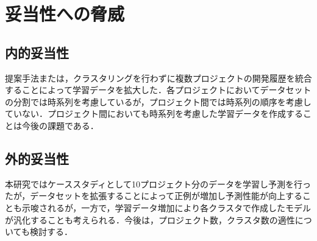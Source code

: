 \documentclass[T,J]{fose} %
\begin{document}



\section{妥当性への脅威}\label{sec:heuristic}
\subsection{内的妥当性}

提案手法または，クラスタリングを行わずに複数プロジェクトの開発履歴を統合することによって学習データを拡大した．各プロジェクトにおいてデータセットの分割では時系列を考慮しているが，プロジェクト間では時系列の順序を考慮していない．プロジェクト間においても時系列を考慮した学習データを作成することは今後の課題である．



\subsection{外的妥当性}

本研究ではケーススタディとして10プロジェクト分のデータを学習し予測を行ったが，データセットを拡張することによって正例が増加し予測性能が向上することも示唆されるが，一方で，学習データ増加により各クラスタで作成したモデルが汎化することも考えられる．今後は，プロジェクト数，クラスタ数の適性についても検討する．
\end{document}
